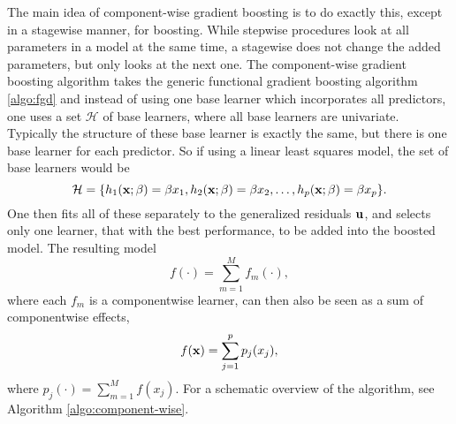 The main idea of component-wise gradient boosting is to do exactly this, except in a stagewise manner, for boosting. While stepwise procedures look at all parameters in a model at the same time, a stagewise does not change the added parameters, but only looks at the next one.
The component-wise gradient boosting algorithm takes the generic functional gradient boosting algorithm \eqref{algo:fgd} and instead of using one base learner which incorporates all predictors, one uses a set $\mathcal{H}$ of base learners, where all base learners are univariate. Typically the structure of these base learner is exactly the same, but there is one base learner for each predictor. So if using a linear least squares model, the set of base learners would be
\begin{equation}
    \mathcal{H}=\{h_1(\mathbf{x};\beta)=\beta x_1,h_2(\mathbf{x};\beta)=\beta x_2,\ldots,h_p(\mathbf{x};\beta)=\beta x_p \}.
\end{equation}
One then fits all of these separately to the generalized residuals $\mathbf{u}$, and selects only one learner, that with the best performance, to be added into the boosted model. The resulting model
\begin{equation}
    f(\cdot)=\sum_{m=1}^Mf_m(\cdot),
\end{equation}
where each $f_m$ is a componentwise learner, can then also be seen as a sum of componentwise effects,
\begin{equation*}
    f(\mathbf{x})=\sum_{j=1}^p p_j(x_j),
\end{equation*}
where $p_j(\cdot)=\sum_{m=1}^M f(x_j)$. For a schematic overview of the algorithm, see Algorithm \ref{algo:component-wise}.
